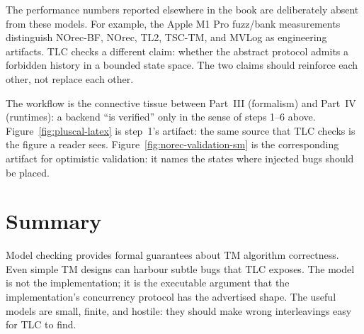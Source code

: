 The performance numbers reported elsewhere in the book are deliberately absent
from these models.  For example, the Apple M1 Pro fuzz/bank measurements distinguish
NOrec-BF, NOrec, TL2, TSC-TM, and MVLog as engineering artifacts.  TLC checks a
different claim: whether the abstract protocol admits a forbidden history in a
bounded state space.  The two claims should reinforce each other, not replace
each other.

The workflow is the connective tissue between Part~III (formalism) and Part~IV
(runtimes): a backend ``is verified'' only in the sense of steps 1--6 above.
Figure~\ref{fig:pluscal-latex} is step~1's artifact: the same source that TLC
checks is the figure a reader sees.  Figure~\ref{fig:norec-validation-sm} is the
corresponding artifact for optimistic validation: it names the states where
injected bugs should be placed.



\section{Summary}

Model checking provides formal guarantees about TM algorithm correctness.  Even
simple TM designs can harbour subtle bugs that TLC exposes.  The model is not
the implementation; it is the executable argument that the implementation's
concurrency protocol has the advertised shape.  The useful models are small,
finite, and hostile: they should make wrong interleavings easy for TLC to find.

